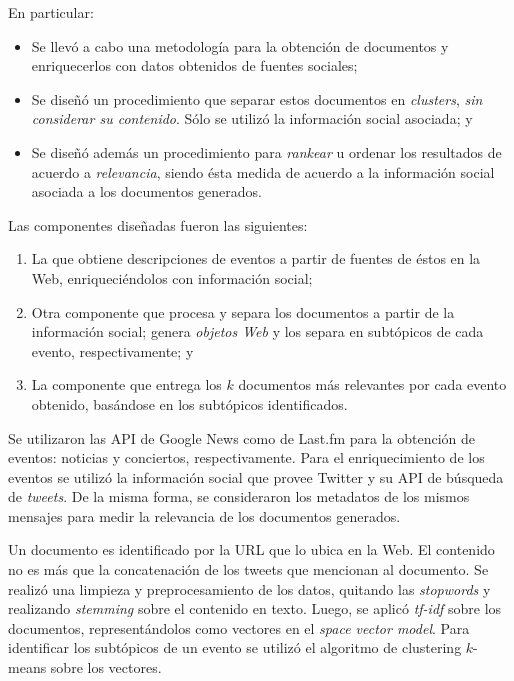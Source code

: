\documentclass[upright, contnum]{umemoria}
\begin{document}
   En particular:

\begin{itemize}
\item Se llevó a cabo una metodología para la obtención de documentos y
     enriquecerlos con datos obtenidos de fuentes sociales;
\item Se diseñó un procedimiento que separar estos documentos en
     \emph{clusters}, \emph{sin considerar su contenido}. Sólo se utilizó la
     información social asociada; y
\item Se diseñó además un procedimiento para \emph{rankear} u ordenar los
     resultados de acuerdo a \emph{relevancia}, siendo ésta medida de
     acuerdo a la información social asociada a los documentos
     generados.
\end{itemize}
   Las componentes diseñadas fueron las siguientes:

\begin{enumerate}
\item La que obtiene descripciones de eventos a partir de fuentes de
      éstos en la Web, enriqueciéndolos con información social;
\item Otra componente que procesa y separa los documentos a partir de
      la información social; genera \emph{objetos Web} y los separa en
      subtópicos de cada evento, respectivamente; y
\item La componente que entrega los $k$ documentos más relevantes por
      cada evento obtenido, basándose en los subtópicos identificados.
\end{enumerate}
   Se utilizaron las API de Google News como de Last.fm para la
   obtención de eventos: noticias y conciertos, respectivamente. Para
   el enriquecimiento de los eventos se utilizó la información social
   que provee Twitter y su API de búsqueda de \emph{tweets}. De la misma
   forma, se consideraron los metadatos de los mismos mensajes para medir
   la relevancia de los documentos generados. 

   Un documento es identificado por la URL que lo ubica en la Web. El
   contenido no es más que la concatenación de los tweets que
   mencionan al documento. Se realizó una limpieza y preprocesamiento
   de los datos, quitando las \emph{stopwords} y realizando \emph{stemming}
   sobre el contenido en texto. Luego, se aplicó \emph{tf-idf} sobre los
   documentos, representándolos como vectores en el \emph{space vector    model}. Para identificar los subtópicos de un evento se utilizó el 
   algoritmo de clustering $k$-means sobre los vectores. 
\end{document}
